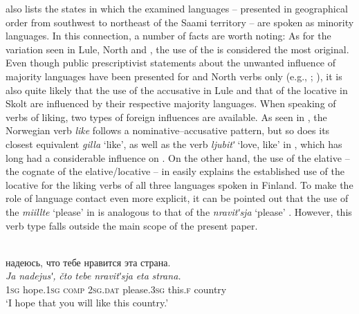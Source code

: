 \documentclass[output=paper]{LSP/langsci}
\begin{document}
 also lists the states in which the examined languages – presented in geographical order from southwest to northeast of the Saami territory – are spoken as minority languages. In this connection, a number of facts are worth noting: As for the variation seen in Lule, North and  , the use of the  is considered the most original. Even though public prescriptivist statements about the unwanted influence of majority languages have been presented for  and North  verbs only (e.g., \citealt[33]{Morottaja2008Anaraskiela}; \citealt[425]{Vuolab-Lohi2007Mailmmi}), it is also quite likely that the use of the accusative in Lule  and that of the locative in Skolt  are influenced by their respective majority languages. When speaking of verbs of liking, two types of foreign influences are available. As seen in , the Norwegian verb \textit{like} follows a nominative–accusative pattern, but so does its closest  equivalent \textit{gilla} ‘like’, as well as the verb \textit{ljubitʹ} ‘love, like’ in , which has long had a considerable influence on . On the other hand, the use of the  elative – the cognate of the  elative/locative – in  easily explains the established use of the locative for the liking verbs of all three  languages spoken in Finland. To make the role of language contact even more explicit, it can be pointed out that the use of the  \textit{miillte} ‘please’ in  is analogous to that of the  \textit{nravitʹsja} ‘please’ . However, this verb type falls outside the main scope of the present paper.

\begin{exe}
\ex%
\label{16-ki-ex:19}
\\
 {надеюсь,} {что} {тебе} {нравится} {эта} {страна.}\\
\textit{Ja} \textit{nadejusʹ,} \textit{čto} \textit{tebe} \textit{nravitʹsja} \textit{eta} \textit{strana.}\\
\textsc{1sg} hope.\textsc{1sg} \textsc{comp} \textsc{2sg}.\textsc{dat} please.\textsc{3sg} this.\textsc{f} country\\
\glt ‘I hope that you will like this country.’
\end{exe}
\end{document}
